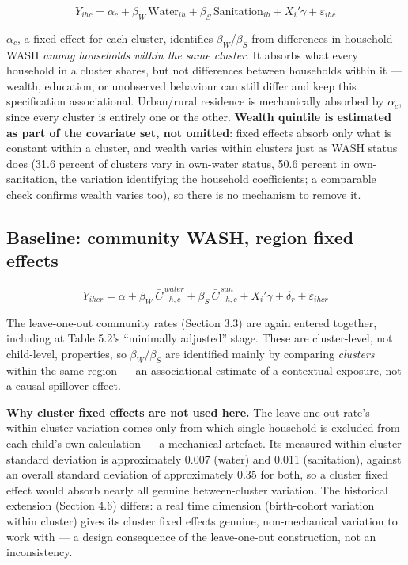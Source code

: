 \[Y_{ihc} = \alpha_c + \beta_W\,\text{Water}_{ih} + \beta_S\,\text{Sanitation}_{ih} + X_i'\gamma + \varepsilon_{ihc}\]

\(\alpha_c\), a fixed effect for each cluster, identifies \(\beta_W\)/\(\beta_S\) from differences in household WASH \emph{among households within the same cluster}. It absorbs what every household in a cluster shares, but not differences between households within it --- wealth, education, or unobserved behaviour can still differ and keep this specification associational. Urban/rural residence is mechanically absorbed by \(\alpha_c\), since every cluster is entirely one or the other. \textbf{Wealth quintile is estimated as part of the covariate set, not omitted}: fixed effects absorb only what is constant within a cluster, and wealth varies within clusters just as WASH status does (31.6 percent of clusters vary in own-water status, 50.6 percent in own-sanitation, the variation identifying the household coefficients; a comparable check confirms wealth varies too), so there is no mechanism to remove it.

\subsection{Baseline: community WASH, region fixed effects}\label{sec:4.3}

\[Y_{ihcr} = \alpha + \beta_W\,\bar{C}^{\,water}_{-h,c} + \beta_S\,\bar{C}^{\,san}_{-h,c} + X_i'\gamma + \delta_r + \varepsilon_{ihcr}\]

The leave-one-out community rates (Section 3.3) are again entered together, including at Table 5.2's ``minimally adjusted'' stage. These are cluster-level, not child-level, properties, so \(\beta_W\)/\(\beta_S\) are identified mainly by comparing \emph{clusters} within the same region --- an associational estimate of a contextual exposure, not a causal spillover effect.

\textbf{Why cluster fixed effects are not used here.} The leave-one-out rate's within-cluster variation comes only from which single household is excluded from each child's own calculation --- a mechanical artefact. Its measured within-cluster standard deviation is approximately 0.007 (water) and 0.011 (sanitation), against an overall standard deviation of approximately 0.35 for both, so a cluster fixed effect would absorb nearly all genuine between-cluster variation. The historical extension (Section 4.6) differs: a real time dimension (birth-cohort variation within cluster) gives its cluster fixed effects genuine, non-mechanical variation to work with --- a design consequence of the leave-one-out construction, not an inconsistency.

